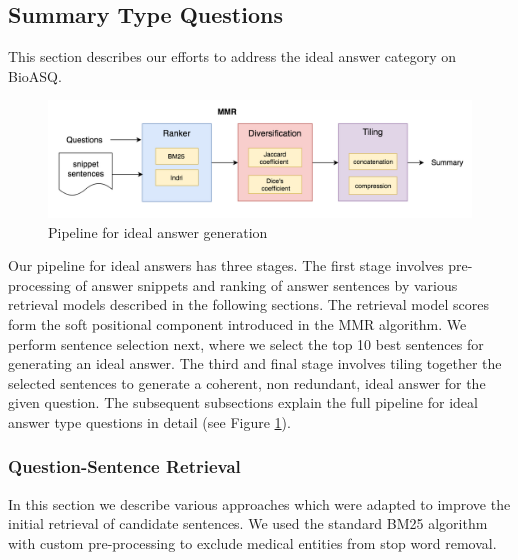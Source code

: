 \subsection{Summary Type Questions}
\label{approach1}
This section describes our efforts to address the ideal answer category on BioASQ. %

 \begin{figure}
     \centering
     \includegraphics[scale=0.3]{images/pipeline_summary.png}
     \caption{Pipeline for ideal answer generation}
     \label{fig:ideal_answers_pipeline}
 \end{figure}

Our pipeline for ideal answers has three stages. The first stage involves pre-processing of answer snippets and ranking of answer sentences by various retrieval models described in the following sections. The retrieval model scores form the soft positional component introduced in the MMR algorithm. We perform sentence selection next, where we select the top 10 best sentences for generating an ideal answer. The third and final stage involves tiling together the selected sentences to generate a coherent, non redundant, ideal answer for the given question. 
The subsequent subsections explain the full pipeline for ideal answer type questions in detail (see Figure \ref{fig:ideal_answers_pipeline}).

\subsubsection{Question-Sentence Retrieval}
In this section we describe various approaches which were adapted to improve the initial retrieval of candidate sentences. We used the standard BM25 algorithm with custom pre-processing to exclude medical entities from stop word removal.  

